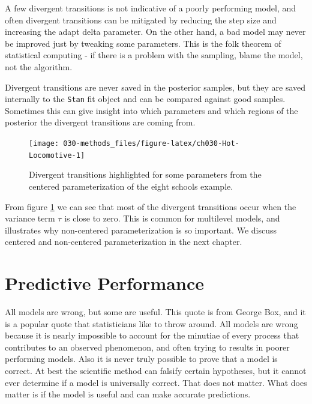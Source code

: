 \documentclass[11pt, oneside, openany]{scrbook}
\begin{document}
A few divergent transitions is not indicative of a poorly performing model, and often divergent transitions can be mitigated by reducing the step size and increasing the adapt delta parameter. On the other hand, a bad model may never be improved just by tweaking some parameters. This is the folk theorem of statistical computing - if there is a problem with the sampling, blame the model, not the algorithm.

Divergent transitions are never saved in the posterior samples, but they are saved internally to the \texttt{Stan} fit object and can be compared against good samples. Sometimes this can give insight into which parameters and which regions of the posterior the divergent transitions are coming from.

\begin{figure}

{\centering \texttt{[image: 030-methods\_files/figure-latex/ch030-Hot-Locomotive-1]} 

}

\caption{Divergent transitions highlighted for some parameters from the centered parameterization of the eight schools example.}\label{fig:ch030-Hot-Locomotive}
\end{figure}

From figure \ref{fig:ch030-Hot-Locomotive} we can see that most of the divergent transitions occur when the variance term \(\tau\) is close to zero. This is common for multilevel models, and illustrates why non-centered parameterization is so important. We discuss centered and non-centered parameterization in the next chapter.

\hypertarget{predictive-performance}{%
\section{Predictive Performance}\label{predictive-performance}}

All models are wrong, but some are useful. This quote is from George Box, and it is a popular quote that statisticians like to throw around. All models are wrong because it is nearly impossible to account for the minutiae of every process that contributes to an observed phenomenon, and often trying to results in poorer performing models. Also it is never truly possible to prove that a model is correct. At best the scientific method can falsify certain hypotheses, but it cannot ever determine if a model is universally correct. That does not matter. What does matter is if the model is useful and can make accurate predictions.
\end{document}

